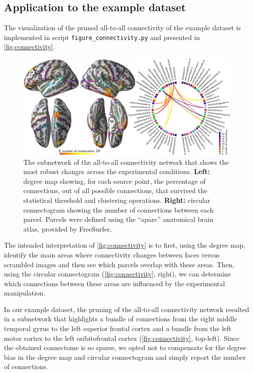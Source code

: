 \documentclass[utf8]{frontiersSCNS}
\newcommand{\code}[1]{\lstinline{#1}}
\begin{document}
\subsection{Application to the example dataset}

The visualization of the pruned all-to-all connectivity of the example dataset is implemented in script \code{figure_connectivity.py} and presented in \autoref{fig:connectivity}.

\begin{figure}
    \includegraphics[width=\textwidth]{figures/connectivity.pdf}
    \caption{The subnetwork of the all-to-all connectivity network that shows the most robust changes across the experimental conditions. \textbf{Left:} degree map showing, for each source point, the percentage of connections, out of all possible connections, that survived the statistical threshold and clustering operations. \textbf{Right:} circular connectogram showing the number of connections between each parcel. Parcels were defined using the ``aparc'' anatomical brain atlas, provided by FreeSurfer.}\label{fig:connectivity}
\end{figure}

The intended interpretation of \autoref{fig:connectivity} is to first, using the degree map, identify the main areas where connectivity changes between faces versus scrambled images and then see which parcels overlap with these areas.
Then, using the circular connectogram (\autoref{fig:connectivity}, right), we can determine which connections between these areas are influenced by the experimental manipulation.

In our example dataset, the pruning of the all-to-all connectivity network resulted in a subnetwork that highlights a bundle of connections from the right middle temporal gyrus to the left superior frontal cortex and a bundle from the left motor cortex to the left oribitofrontal cortex (\autoref{fig:connectivity}, top-left).
Since the obtained connectome is so sparse, we opted not to compensate for the degree bias in the degree map and circular connectogram and simply report the number of connections.
\end{document}
